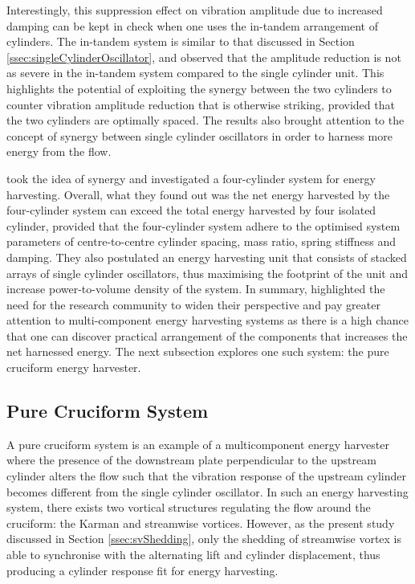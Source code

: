 \documentclass[oneside]{utmthesis}
\begin{document}
Interestingly, this suppression effect on vibration amplitude due to increased damping can be kept in check when one uses the in-tandem arrangement of cylinders. The in-tandem system is similar to that discussed in Section \ref{ssec:singleCylinderOscillator}, and \citet{Sun2019b} observed that the amplitude reduction is not as severe in the in-tandem system compared to the single cylinder unit. This highlights the potential of exploiting the synergy between the two cylinders to counter vibration amplitude reduction that is otherwise striking, provided that the two cylinders are optimally spaced. The results also brought attention to the concept of synergy between single cylinder oscillators in order to harness more energy from the flow.

\citet{Kim2016} took the idea of synergy and investigated a four-cylinder system for energy harvesting. Overall, what they found out was the net energy harvested by the four-cylinder system can exceed the total energy harvested by four isolated cylinder, provided that the four-cylinder system adhere to the optimised system parameters of centre-to-centre cylinder spacing, mass ratio, spring stiffness and damping. They also postulated an energy harvesting unit that consists of stacked arrays of single cylinder oscillators, thus maximising the footprint of the unit and increase power-to-volume density of the system. In summary, \citet{Kim2016} highlighted the need for the research community to widen their perspective and pay greater attention to multi-component energy harvesting systems as there is a high chance that one can discover practical arrangement of the components that increases the net harnessed energy. The next subsection explores one such system: the pure cruciform energy harvester.

\subsection{Pure Cruciform System} \label{ssec:pureCruciformHarvester}
A pure cruciform \citep{Zou2021} system  is an example of a multicomponent energy harvester where the presence of the downstream plate perpendicular to the upstream cylinder alters the flow such that the vibration response of the upstream cylinder becomes different from the single cylinder oscillator. In such an energy harvesting system, there exists two vortical structures regulating the flow around the cruciform: the Karman and streamwise vortices. However, as the present study discussed in Section \ref{ssec:svShedding}, only the shedding of streamwise vortex is able to synchronise with the alternating lift and cylinder displacement, thus producing a cylinder response fit for energy harvesting.
\end{document}
